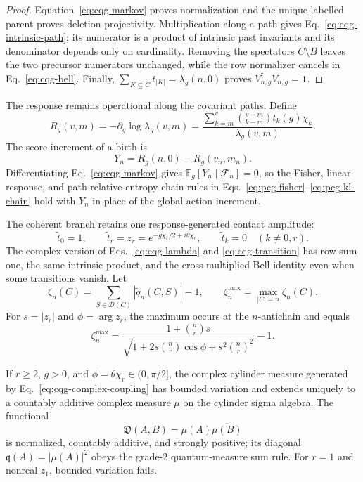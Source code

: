 \begin{proof}
Equation~\eqref{eq:cqg-markov} proves normalization and the unique labelled
parent proves deletion projectivity.  Multiplication along a path gives
Eq.~\eqref{eq:cqg-intrinsic-path}; its numerator is a product of intrinsic
past invariants and its denominator depends only on cardinality.  Removing
the spectators \(C\setminus B\) leaves the two precursor numerators
unchanged, while the row normalizer cancels in
Eq.~\eqref{eq:cqg-bell}.  Finally,
\(\sum_{K\subseteq C}t_{|K|}=\lambda_g(n,0)\) proves
\(V_{n,g}^\dagger V_{n,g}=\mathbf1\).
\end{proof}

The response remains operational along the covariant paths.  Define
\begin{equation}
 R_g(v,m)=-\partial_g\log\lambda_g(v,m)
 =\frac{\sum_{k=m}^{v}\binom{v-m}{k-m}t_k(g)\chi_k}
 {\lambda_g(v,m)}.
 \label{eq:cqg-response-mean}
\end{equation}
The score increment of a birth is
\[
 Y_n=R_g(n,0)-R_g(v_n,m_n).
\]
Differentiating Eq.~\eqref{eq:cqg-markov} gives
\(\mathbb E_g[Y_n\mid\mathcal F_n]=0\), so the Fisher, linear-response, and
path-relative-entropy chain rules in
Eqs.~\eqref{eq:pcg-fisher}--\eqref{eq:pcg-kl-chain} hold with \(Y_n\) in
place of the global action increment.

The coherent branch retains one response-generated contact amplitude:
\begin{equation}
 \widetilde t_0=1,\qquad
 \widetilde t_r=z_r=e^{-g\chi_r/2+i\theta\chi_r},\qquad
 \widetilde t_k=0\quad(k\neq0,r).
 \label{eq:cqg-complex-coupling}
\end{equation}
The complex version of Eqs.~\eqref{eq:cqg-lambda} and
\eqref{eq:cqg-transition} has row sum one, the same intrinsic product, and
the cross-multiplied Bell identity even when some transitions vanish.
Let
\[
 \zeta_n(C)=\sum_{S\in\mathcal D(C)}
 |\widetilde q_n(C,S)|-1,\qquad
 \zeta_n^{\max}=\max_{|C|=n}\zeta_n(C).
\]
For \(s=|z_r|\) and \(\phi=\arg z_r\), the maximum occurs at the
\(n\)-antichain \cite{SuryaZalel2020} and equals
\begin{equation}
 \zeta_n^{\max}
 =\frac{1+\binom nr s}
 {\sqrt{1+2s\binom nr\cos\phi+s^2\binom nr^2}}-1.
 \label{eq:cqg-zeta}
\end{equation}

\begin{theorem}
\label{thm:cqg-complex-extension}
If \(r\geq2\), \(g>0\), and
\(\phi=\theta\chi_r\in(0,\pi/2]\), the complex cylinder measure generated by
Eq.~\eqref{eq:cqg-complex-coupling} has bounded variation and extends
uniquely to a countably additive complex measure \(\mu\) on the cylinder
sigma algebra.  The functional
\begin{equation}
 \mathfrak D(A,B)=\mu(A)\overline{\mu(B)}
 \label{eq:cqg-decoherence}
\end{equation}
is normalized, countably additive, and strongly positive; its diagonal
\(\mathfrak q(A)=|\mu(A)|^2\) obeys the grade-2 quantum-measure sum rule.
For \(r=1\) and nonreal \(z_1\), bounded variation fails.
\end{theorem}

